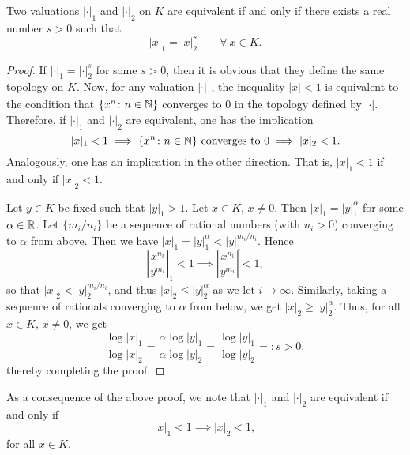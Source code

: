 \begin{proposition}
    Two valuations $|\cdot|_1$ and $|\cdot|_2$ on $K$ are equivalent if and only if there exists a real number $s > 0$ such that 
    \begin{equation*}
        |x|_1 = |x|_2^s\qquad\forall~x\in K.
    \end{equation*}
\end{proposition}
\begin{proof}
    If $|\cdot|_1 = |\cdot|_2^s$ for some $s > 0$, then it is obvious that they define the same topology on $K$. Now, for any valuation $|\cdot|_1$, the inequality $|x| < 1$ is equivalent to the condition that $\{x^n\colon n\in\mathbb{N}\}$ converges to $0$ in the topology defined by $|\cdot|$. Therefore, if $|\cdot|_1$ and $|\cdot|_2$ are equivalent, one has the implication 
    \begin{equation*}
        |x|_1 < 1\implies\{x^n\colon n\in\mathbb{N}\}\text{ converges to }0\implies |x|_2 < 1.
    \end{equation*}
    Analogously, one has an implication in the other direction. That is, $|x|_1 < 1$ if and only if $|x|_2 < 1$.

    Let $y\in K$ be fixed such that $|y|_1 > 1$. Let $x\in K$, $x\ne 0$. Then $|x|_1 = |y|_1^\alpha$ for some $\alpha\in\mathbb{R}$. Let $\{m_i/n_i\}$ be a sequence of rational numbers (with $n_i > 0$) converging to $\alpha$ from above. Then we have $|x|_1 = |y|_1^\alpha < |y|_1^{m_i/n_i}$. Hence 
    \begin{equation*}
        \left|\frac{x^{n_i}}{y^{m_i}}\right|_1 < 1 \implies\left|\frac{x^{n_i}}{y^{m_i}}\right| < 1,
    \end{equation*}
    so that $|x|_2 < |y|_2^{m_i/n_i}$, and thus $|x|_2\le |y|_2^\alpha$ as we let $i\to\infty$. Similarly, taking a sequence of rationals converging to $\alpha$ from below, we get $|x|_2\ge|y|_2^\alpha$. Thus, for all $x\in K$, $x\ne 0$, we get 
    \begin{equation*}
        \frac{\log |x|_1}{\log |x|_2} = \frac{\alpha\log |y|_1}{\alpha\log |y|_2} = \frac{\log |y|_1}{\log |y|_2} =: s > 0,
    \end{equation*}
    thereby completing the proof.
\end{proof}
\begin{remark}
    As a consequence of the above proof, we note that $|\cdot|_1$ and $|\cdot|_2$ are equivalent if and only if 
    \begin{equation*}
        |x|_1 < 1\implies |x|_2 < 1,
    \end{equation*}
    for all $x\in K$.
\end{remark}

